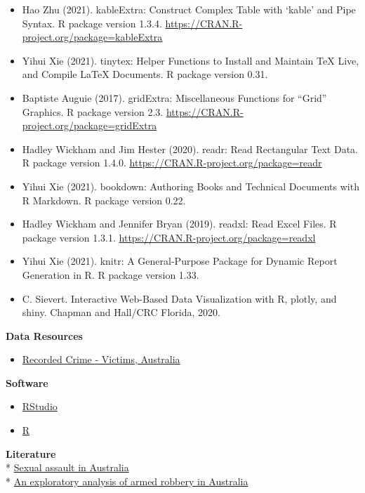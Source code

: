 \documentclass[11pt,a4paper,]{article}
\providecommand{\tightlist}{%
  \setlength{\itemsep}{0pt}\setlength{\parskip}{0pt}}
\begin{document}
\begin{itemize}
\tightlist
\item
  Hao Zhu (2021). kableExtra: Construct Complex Table with `kable' and Pipe Syntax. R package version 1.3.4.
  \url{https://CRAN.R-project.org/package=kableExtra}\\
\item
  Yihui Xie (2021). tinytex: Helper Functions to Install and Maintain TeX Live, and Compile LaTeX
  Documents. R package version 0.31.\\
\item
  Baptiste Auguie (2017). gridExtra: Miscellaneous Functions for ``Grid'' Graphics. R package version 2.3.
  \url{https://CRAN.R-project.org/package=gridExtra}\\
\item
  Hadley Wickham and Jim Hester (2020). readr: Read Rectangular Text Data. R package version 1.4.0.
  \url{https://CRAN.R-project.org/package=readr}\\
\item
  Yihui Xie (2021). bookdown: Authoring Books and Technical Documents with R Markdown. R package version
  0.22.\\
\item
  Hadley Wickham and Jennifer Bryan (2019). readxl: Read Excel Files. R package version 1.3.1.
  \url{https://CRAN.R-project.org/package=readxl}\\
\item
  Yihui Xie (2021). knitr: A General-Purpose Package for Dynamic Report Generation in R. R package version
  1.33.\\
\item
  C. Sievert. Interactive Web-Based Data Visualization with R, plotly, and shiny. Chapman and Hall/CRC
  Florida, 2020.
\end{itemize}

\textbf{Data Resources}

\begin{itemize}
\tightlist
\item
  \href{https://www.abs.gov.au/statistics/people/crime-and-justice/recorded-crime-victims/latest-release}{Recorded Crime - Victims, Australia}
\end{itemize}

\textbf{Software}

\begin{itemize}
\tightlist
\item
  \href{http://www.rstudio.com/}{RStudio}\\
\item
  \href{https://www.R-project.org/}{R}
\end{itemize}

\textbf{Literature}\\
* \href{https://www.aihw.gov.au/getmedia/0375553f-0395-46cc-9574-d54c74fa601a/aihw-fdv-5.pdf.aspx?inline=true}{Sexual assault in Australia}\\
* \href{https://www.aic.gov.au/publications/tbp/tbp7}{An exploratory analysis of armed robbery in Australia}

\printbibliography
\end{document}
